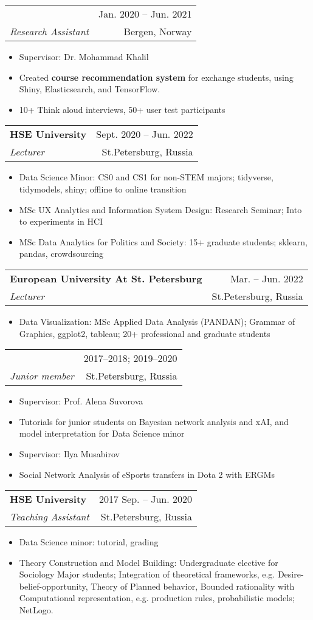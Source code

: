 \documentclass[letterpaper,11pt]{article}
\makeatletter
\newcommand{\myuline}[1]{%
  \uline{\phantom{#1}}%
  \llap{\contour{white}{#1}}%
}
\newcommand{\MYhref}[2]{
\myuline{\href{#1}{{#2}}}
}%
\newcommand{\resumeItem}[1]{
  \item\small{
    {#1 \vspace{-1pt}}
  }
}
\newcommand{\resumeSubheading}[4]{
  \vspace{-10pt}\item
    \begin{tabular*}{\textwidth}[t]{l@{\extracolsep{\fill}}r}
      \textbf{#1} & {\color{dark-grey}\small #2}\vspace{1pt}\\ %
      \hspace{2pt}\textit{#3} & {\color{dark-grey} \small #4}\\ %
    \end{tabular*}\vspace{-4pt}
}
\newcommand{\resumeItemListStart}{\begin{itemize}[label={-}]}
\newcommand{\resumeItemListEnd}{\end{itemize}\vspace{0pt}}
\makeatother
\begin{document}
    \resumeSubheading
      {\MYhref{https://slate.uib.no}{SLATE} Center at University of Bergen}{Jan. 2020 -- Jun. 2021}
      {Research Assistant}{Bergen, Norway}
      \resumeItemListStart
        \resumeItem{Supervisor: Dr. Mohammad Khalil}
        \resumeItem{Created \textbf{course recommendation system} for exchange students, using Shiny, Elasticsearch, and TensorFlow.}
        \resumeItem{10+ Think aloud interviews, 50+ user test participants}
    \resumeItemListEnd

    \resumeSubheading
      {HSE University}{Sept. 2020 -- Jun. 2022}
      {Lecturer}{St.Petersburg, Russia}
      \resumeItemListStart
        \resumeItem{Data Science Minor: CS0 and CS1 for non-STEM majors; tidyverse, tidymodels, shiny; offline to online transition}
        \resumeItem{MSc UX Analytics and Information System Design: Research Seminar; Into to experiments in HCI}
        \resumeItem{MSc Data Analytics for Politics and Society: 15+ graduate students; sklearn, pandas, crowdsourcing}
      \resumeItemListEnd
    \resumeSubheading
      {European University At St. Petersburg}{Mar. -- Jun. 2022}
      {Lecturer}{St.Petersburg, Russia}
      \resumeItemListStart
        \resumeItem{Data Visualization: MSc Applied Data Analysis (PANDAN); Grammar of Graphics, ggplot2, tableau; 20+ professional and graduate students}
      \resumeItemListEnd

    \resumeSubheading
    {\MYhref{https://spb.hse.ru/en/fmcs/math/sociocomp/}{SocComp} research group at HSE University}{2017--2018; 2019--2020}
    {Junior member}{St.Petersburg, Russia}
        \resumeItemListStart
        \resumeItem{Supervisor: Prof. Alena Suvorova}
        \resumeItem{Tutorials for junior students on Bayesian network analysis and xAI, and model interpretation for Data Science minor}
        \resumeItem{Supervisor: Ilya Musabirov}
        \resumeItem{Social Network Analysis of eSports transfers in Dota 2 with ERGMs}
        \resumeItemListEnd

        \resumeSubheading
    {HSE University}{2017 Sep. -- Jun. 2020}
    {Teaching Assistant}{St.Petersburg, Russia}
        \resumeItemListStart
        \resumeItem{Data Science minor: tutorial, grading}
        \resumeItem{Theory Construction and Model Building: Undergraduate elective for Sociology Major students; Integration of theoretical frameworks, e.g. Desire-belief-opportunity, Theory of Planned behavior, Bounded rationality with Computational representation, e.g. production rules,  probabilistic models; NetLogo.}
        \resumeItemListEnd
\end{document}
